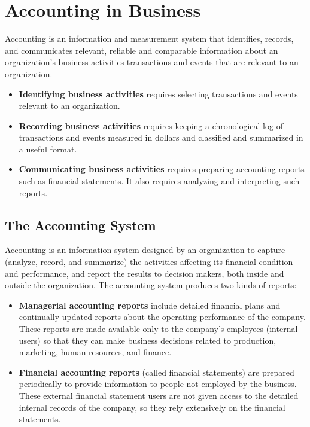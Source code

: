 \documentclass[../main.tex]{subfiles}
\begin{document}
	\section{Accounting in Business}
	
	Accounting is an information and measurement system that identifies, 
	records, and communicates relevant, reliable and comparable information 
	about an organization's business activities \ie transactions and events 
	that are relevant to an organization.
	\begin{itemize}[noitemsep]
		\item \textbf{Identifying business activities} requires selecting 
		transactions 
		and events relevant to an organization.  
		\item \textbf{Recording business activities} 
		requires keeping a chronological log of transactions and events 
		measured in dollars and classified and summarized in a useful format. 
		\item \textbf{Communicating business activities} requires preparing 
		accounting 
		reports such as financial statements. It also requires analyzing and 
		interpreting such reports.
	\end{itemize}
	
	
	\subsection{The Accounting System}
	
	Accounting is an information system designed by an organization to capture 
	(analyze, record, and summarize) the activities affecting its financial 
	condition and performance, and report the results to decision makers, 
	both inside and outside the organization. 
	The accounting system produces two kinds of reports:
	\begin{itemize}[noitemsep]
		\item \textbf{Managerial accounting reports} include detailed financial 
		plans and continually updated reports about the operating performance 
		of the company. These reports are made available only to the company’s 
		employees (internal users) so that they can make business decisions 
		related to production, marketing, human resources, and finance.
		\item \textbf{Financial accounting reports} (called financial 
		statements) are 
		prepared periodically to provide information to people not employed by 
		the business. These external financial statement users are not given 
		access to the detailed internal records of the company, so they rely 
		extensively on the financial statements. 
	\end{itemize} 
	
\end{document}
